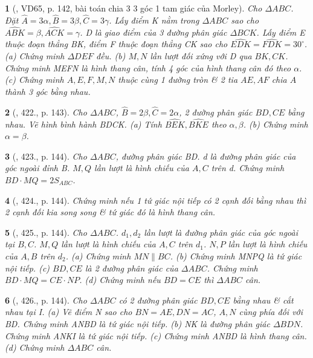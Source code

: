\documentclass{article}
\newtheorem{baitoan}{}
\begin{document}
\begin{baitoan}[\cite{Binh_Toan_9_tap_2}, VD65, p. 142, bài toán chia 3 3 góc 1 tam giác của Morley]
	Cho $\Delta ABC$. Đặt $\widehat{A} = 3\alpha,\widehat{B} = 3\beta,\widehat{C} = 3\gamma$. Lấy điểm K nằm trong $\Delta ABC$ sao cho $\widehat{ABK} = \beta,\widehat{ACK} = \gamma$. D là giao điểm của 3 đường phân giác $\Delta BCK$. Lấy điểm E thuộc đoạn thẳng BK, điểm F thuộc đoạn thẳng CK sao cho $\widehat{EDK} = \widehat{FDK} = 30^\circ$. (a) Chứng minh $\Delta DEF$ đều. (b) $M,N$ lần lượt đối xứng với D qua $BK,CK$. Chứng minh MEFN là hình thang cân, tính 4 góc của hình thang cân đó theo $\alpha$. (c) Chứng minh $A,E,F,M,N$ thuộc cùng 1 đường tròn \& 2 tia $AE,AF$ chia $\widehat{A}$ thành 3 góc bằng nhau.
\end{baitoan}

\begin{baitoan}[\cite{Binh_Toan_9_tap_2}, 422., p. 143]
	Cho $\Delta ABC$, $\widehat{B} = 2\beta,\widehat{C} = 2\alpha$, 2 đường phân giác $BD,CE$ bằng nhau. Vẽ hình bình hành BDCK. (a) Tính $\widehat{BEK},\widehat{BKE}$ theo $\alpha,\beta$. (b) Chứng minh $\alpha = \beta$.
\end{baitoan}

\begin{baitoan}[\cite{Binh_Toan_9_tap_2}, 423., p. 144]
	Cho $\Delta ABC$, đường phân giác BD. d là đường phân giác của góc ngoài đỉnh B. $M,Q$ lần lượt là hình chiếu của $A,C$ trên d. Chứng minh $BD\cdot MQ = 2S_{ABC}$.
\end{baitoan}

\begin{baitoan}[\cite{Binh_Toan_9_tap_2}, 424., p. 144]
	Chứng minh nếu 1 tứ giác nội tiếp có 2 cạnh đối bằng nhau thì 2 cạnh đối kia song song \& tứ giác đó là hình thang cân.
\end{baitoan}

\begin{baitoan}[\cite{Binh_Toan_9_tap_2}, 425., p. 144]
	Cho $\Delta ABC$. $d_1,d_2$ lần lượt là đường phân giác của góc ngoài tại $B,C$. $M,Q$ lần lượt là hình chiếu của $A,C$ trên $d_1$. $N,P$ lần lượt là hình chiếu của $A,B$ trên $d_2$. (a) Chứng minh $MN\parallel BC$. (b) Chứng minh MNPQ là tứ giác nội tiếp. (c) $BD,CE$ là 2 đường phân giác của $\Delta ABC$. Chứng minh $BD\cdot MQ = CE\cdot NP$. (d) Chứng minh nếu $BD = CE$ thì $\Delta ABC$ cân.
\end{baitoan}

\begin{baitoan}[\cite{Binh_Toan_9_tap_2}, 426., p. 144]
	Cho $\Delta ABC$ có 2 đường phân giác $BD,CE$ bằng nhau \& cắt nhau tại I. (a) Vẽ điểm N sao cho $BN = AE,DN = AC$, $A,N$ cùng phía đối với BD. Chứng minh ANBD là tứ giác nội tiếp. (b) NK là đường phân giác $\Delta BDN$. Chứng minh ANKI là tứ giác nội tiếp. (c) Chứng minh ANBD là hình thang cân. (d) Chứng minh $\Delta ABC$ cân.
\end{baitoan}
\end{document}
